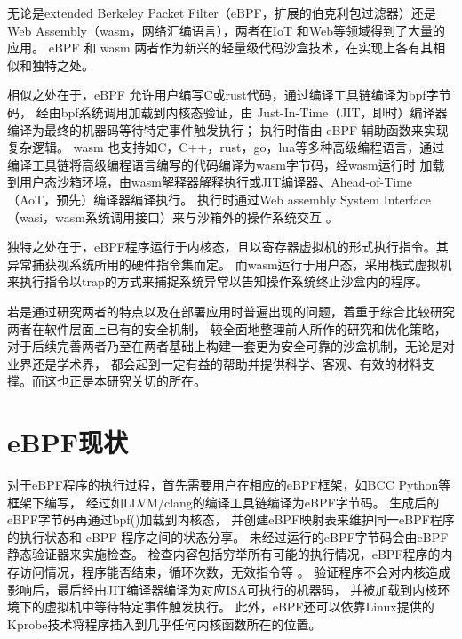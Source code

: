 \documentclass[12pt,a4paper]{article}
\begin{document}
	\begin{sloppypar} %
	无论是extended Berkeley Packet Filter（eBPF，扩展的伯克利包过滤器）还是Web Assembly（wasm，网络汇编语言），两者在IoT
	\cite{zhangResearchWebAssemblyRuntimes2024}和Web\cite{9110434, TCPdump, 10.1145/3371038}等领域得到了大量的应用。
	eBPF 和 wasm 两者作为新兴的轻量级代码沙盒技术，在实现上各有其相似和独特之处。

	相似之处在于，eBPF 允许用户编写C或rust代码，通过编译工具链编译为bpf字节码，
	经由bpf系统调用加载到内核态验证，由 Just-In-Time（JIT，即时）编译器编译为最终的机器码等待特定事件触发执行\cite{FuzzOnEBPF}；
	执行时借由 eBPF 辅助函数来实现复杂逻辑\cite{riceLearningEBPFProgramming2023}。
	wasm 也支持如C，C++，rust，go，lua等多种高级编程语言，通过编译工具链将高级编程语言编写的代码编译为wasm字节码，经wasm运行时
	加载到用户态沙箱环境，由wasm解释器解释执行或JIT编译器、Ahead-of-Time（AoT，预先）编译器编译执行\cite[6]{zhangResearchWebAssemblyRuntimes2024}。
	执行时通过Web assembly System Interface（wasi，wasm系统调用接口）来与沙箱外的操作系统交互
	\cite{zhangResearchWebAssemblyRuntimes2024, zhangCharacterizingDetectingWebAssembly2024}。

	独特之处在于，eBPF程序运行于内核态，且以寄存器虚拟机的形式执行指令。其异常捕获视系统所用的硬件指令集而定。
	而wasm运行于用户态，采用栈式虚拟机来执行指令以trap的方式来捕捉系统异常以告知操作系统终止沙盒内的程序\cite{groupWebAssemblySpecification2024}。

	若是通过研究两者的特点以及在部署应用时普遍出现的问题，着重于综合比较研究两者在软件层面上已有的安全机制，
	较全面地整理前人所作的研究和优化策略，对于后续完善两者乃至在两者基础上构建一套更为安全可靠的沙盒机制，无论是对业界还是学术界，
	都会起到一定有益的帮助并提供科学、客观、有效的材料支撑。而这也正是本研究关切的所在。

	\section{eBPF现状}
	对于eBPF程序的执行过程，首先需要用户在相应的eBPF框架，如BCC Python等框架下编写，
	经过如LLVM/clang的编译工具链编译为eBPF字节码\cite{riceLearningEBPFProgramming2023}。
	生成后的eBPF字节码再通过bpf()加载到内核态\cite{riceLearningEBPFProgramming2023}，
	并创建eBPF映射表来维护同一eBPF程序的执行状态和 eBPF 程序之间的状态分享\cite[2]{bensonNetEditOrchestrationPlatform2024}。
	未经过运行的eBPF字节码会由eBPF静态验证器来实施检查\cite{zhengBpftimeUserspaceEBPF2023, HaoValidating}。
	检查内容包括穷举所有可能的执行情况，eBPF程序的内存访问情况，程序能否结束，循环次数，无效指令等
	\cite{286467, riceLearningEBPFProgramming2023}。
	验证程序不会对内核造成影响后，最后经由JIT编译器编译为对应ISA可执行的机器码\cite{FuzzOnEBPF}，
	并被加载到内核环境下的虚拟机中等待特定事件触发执行\cite{maoMerlinMultitierOptimization2024}。
	此外，eBPF还可以依靠Linux提供的Kprobe技术将程序插入到几乎任何内核函数所在的位置\cite{riceLearningEBPFProgramming2023}。


\end{sloppypar}
\end{document}

